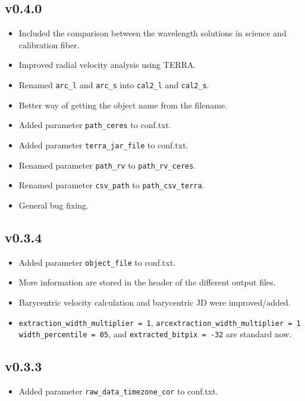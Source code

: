 \documentclass[10pt,a4paper]{article}
\begin{document}
\subsection*{v0.4.0}
\begin{itemize}\setlength\itemsep{0em}
  \item Included the comparison between the wavelength solutions in science and calibration fiber.
  \item Improved radial velocity analysis using TERRA.
  \item Renamed \verb|arc_l| and \verb|arc_s| into \verb|cal2_l| and \verb|cal2_s|.
  \item Better way of getting the object name from the filename.
  \item Added parameter \verb|path_ceres| to conf.txt.
  \item Added parameter \verb|terra_jar_file| to conf.txt.
  \item Renamed parameter \verb|path_rv| to \verb|path_rv_ceres|.
  \item Renamed parameter \verb|csv_path| to \verb|path_csv_terra|.
  \item General bug fixing.
\end{itemize}

\subsection*{v0.3.4}
\begin{itemize}\setlength\itemsep{0em}
 \item Added parameter \verb|object_file| to conf.txt.
 \item More information are stored in the header of the different output files.
 \item Barycentric velocity calculation and barycentric JD were improved/added.
 \item \verb|extraction_width_multiplier = 1|, \verb|arcextraction_width_multiplier = 1| \verb|width_percentile = 05|, and \verb|extracted_bitpix = -32| are standard now.
\end{itemize}

\subsection*{v0.3.3}
\begin{itemize}\setlength\itemsep{0em}
 \item Added parameter \verb|raw_data_timezone_cor| to conf.txt.
\end{itemize}
\end{document}
